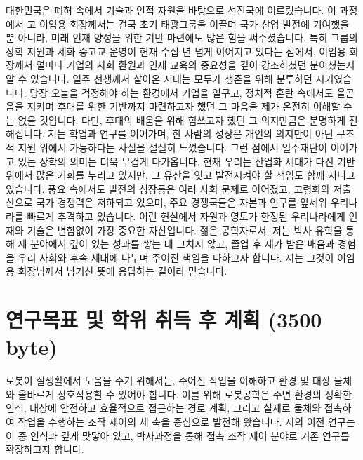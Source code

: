 \documentclass{article}
\begin{document}
대한민국은 폐허 속에서 기술과 인적 자원을 바탕으로 선진국에 이르렀습니다. 이 과정에서 고 이임용 회장께서는 건국 초기 태광그룹을 이끌며 국가 산업 발전에 기여했을 뿐 아니라, 미래 인재 양성을 위한 기반 마련에도 많은 힘을 써주셨습니다. 특히 그룹의 장학 지원과 세화 중고교 운영이 현재 수십 년 넘게 이어지고 있다는 점에서, 이임용 회장께서 얼마나 기업의 사회 환원과 인재 교육의 중요성을 깊이 강조하셨던 분이셨는지 알 수 있습니다. 일주 선생께서 살아온 시대는 모두가 생존을 위해 분투하던 시기였습니다. 당장 오늘을 걱정해야 하는 환경에서 기업을 일구고, 정치적 혼란 속에서도 올곧음을 지키며 후대를 위한 기반까지 마련하고자 했던 그 마음을 제가 온전히 이해할 수는 없을 것입니다. 다만, 후대의 배움을 위해 힘쓰고자 했던 그 의지만큼은 분명하게 전해집니다. 저는 학업과 연구를 이어가며, 한 사람의 성장은 개인의 의지만이 아닌 구조적 지원 위에서 가능하다는 사실을 절실히 느꼈습니다. 그런 점에서 일주재단이 이어가고 있는 장학의 의미는 더욱 무겁게 다가옵니다. 현재 우리는 산업화 세대가 다진 기반 위에서 많은 기회를 누리고 있지만, 그 유산을 잇고 발전시켜야 할 책임도 함께 지니고 있습니다. 풍요 속에서도 발전의 성장통은 여러 사회 문제로 이어졌고, 고령화와 저출산으로 국가 경쟁력은 저하되고 있으며, 주요 경쟁국들은 자본과 인구를 앞세워 우리나라를 빠르게 추격하고 있습니다. 이런 현실에서 자원과 영토가 한정된 우리나라에게 인재와 기술은 변함없이 가장 중요한 자산입니다. 젊은 공학자로서, 저는 박사 유학을 통해 제 분야에서 깊이 있는 성과를 쌓는 데 그치지 않고, 졸업 후 제가 받은 배움과 경험을 우리 사회와 후속 세대에 나누며 주어진 책임을 다하고자 합니다. 저는 그것이 이임용 회장님께서 남기신 뜻에 응답하는 길이라 믿습니다.

\pagebreak

\section{연구목표 및 학위 취득 후 계획 (3500 byte)}

로봇이 실생활에서 도움을 주기 위해서는, 주어진 작업을 이해하고 환경 및 대상 물체와 올바르게 상호작용할 수 있어야 합니다. 이를 위해 로봇공학은 주변 환경의 정확한 인식, 대상에 안전하고 효율적으로 접근하는 경로 계획, 그리고 실제로 물체와 접촉하여 작업을 수행하는 조작 제어의 세 축을 중심으로 발전해 왔습니다. 저의 이전 연구는 이 중 인식과 깊게 맞닿아 있고, 박사과정을 통해 접촉 조작 제어 분야로 기존 연구를 확장하고자 합니다. 
\end{document}

